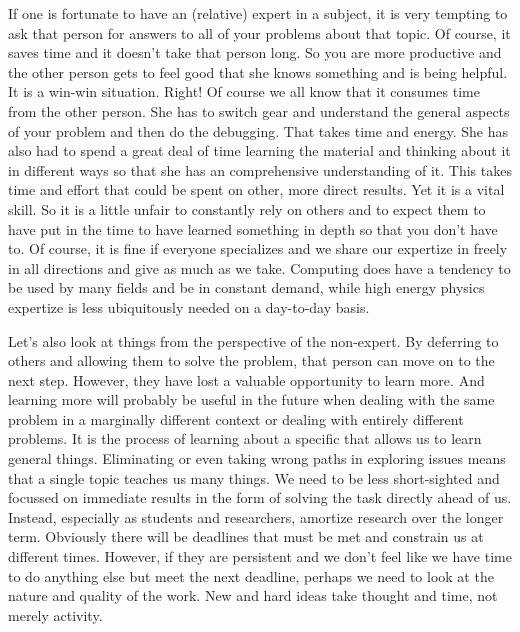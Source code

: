 If one is fortunate to have an (relative) expert 
in a subject, it is very tempting to ask that person 
for answers to all of your problems about that topic.
Of course, it saves time and it doesn't  
take that person long. So you
are more productive and the other person
gets to feel good that she knows something and
is being helpful. 
It is a win-win situation. Right! Of course
we all know that it consumes time from
the other person. She has to switch gear
and understand the general aspects
of your problem and then do the debugging.
That takes time and energy.   She has also
had to spend a great deal of time learning
the material and thinking about it in different
ways so that she has an comprehensive
understanding of it.  This takes time and 
effort that could be spent on other, more
direct results.  Yet it is a vital skill.
So it is a little unfair to constantly 
rely on others and to expect them to have
put in the time to have learned something
in depth so that you don't have to.
Of course, it is fine if everyone
specializes and we share our expertize in
freely in all directions and give as much as we take.
Computing does have a tendency to be used by many
fields and be in constant demand,
while high energy physics expertize is less 
ubiquitously needed on a day-to-day basis.

Let's also look at  things from the perspective
of the non-expert.
By deferring to others and allowing them to 
solve the problem, that person can move on
to the next step.
However, they have lost a valuable opportunity to
learn more.  And learning more will probably
be useful in the future when dealing with
the same problem in a marginally different context
or dealing with entirely different problems.
It is the process of learning about a
specific that allows us to learn general things.
Eliminating or even taking wrong paths 
in exploring issues
means that a single topic teaches us many things.
We need to be less short-sighted and focussed on
immediate results in the form of solving the
task directly ahead of us. Instead, especially as students
and researchers, amortize research over the longer
term. Obviously there will be deadlines that must
be met and constrain us at different times.
However, if they are persistent and we don't
feel like we have time to do anything else
but meet the next deadline, perhaps we need to 
look at the nature and quality of the work.
New and hard ideas take thought and time,
not merely activity.



